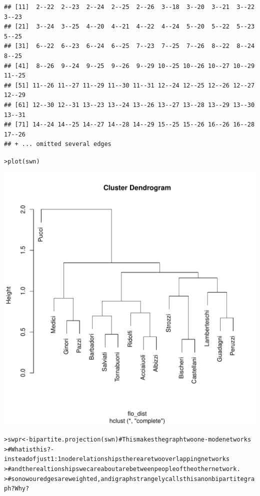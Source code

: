 \documentclass[12pt]{article}\usepackage[]{graphicx}\usepackage[]{color}
\makeatletter
\newcommand{\hlcom}[1]{\textcolor[rgb]{0.404,0.408,0.42}{#1}}%
\newcommand{\hlstd}[1]{\textcolor[rgb]{0.882,0.878,0.898}{#1}}%
\newcommand{\hlkwb}[1]{\textcolor[rgb]{0.902,0.675,0.196}{#1}}%
\newcommand{\hlkwd}[1]{\textcolor[rgb]{0.733,0.388,0.812}{#1}}%
\newenvironment{kframe}{%
 \def\at@end@of@kframe{}%
 \ifinner\ifhmode%
  \def\at@end@of@kframe{\end{minipage}}%
  \begin{minipage}{\columnwidth}%
 \fi\fi%
 \def\FrameCommand##1{\hskip\@totalleftmargin \hskip-\fboxsep
 \colorbox{shadecolor}{##1}\hskip-\fboxsep
     \hskip-\linewidth \hskip-\@totalleftmargin \hskip\columnwidth}%
 \MakeFramed {\advance\hsize-\width
   \@totalleftmargin\z@ \linewidth\hsize
   \@setminipage}}%
 {\par\unskip\endMakeFramed%
 \at@end@of@kframe}
\newenvironment{knitrout}{}{} %
\makeatother
\begin{document}
\begin{flushleft}
\begin{center}
\begin{knitrout}
\begin{kframe}
\begin{verbatim}
## [11]  2--22  2--23  2--24  2--25  2--26  3--18  3--20  3--21  3--22  3--23
## [21]  3--24  3--25  4--20  4--21  4--22  4--24  5--20  5--22  5--23  5--25
## [31]  6--22  6--23  6--24  6--25  7--23  7--25  7--26  8--22  8--24  8--25
## [41]  8--26  9--24  9--25  9--26  9--29 10--25 10--26 10--27 10--29 11--25
## [51] 11--26 11--27 11--29 11--30 11--31 12--24 12--25 12--26 12--27 12--29
## [61] 12--30 12--31 13--23 13--24 13--26 13--27 13--28 13--29 13--30 13--31
## [71] 14--24 14--25 14--27 14--28 14--29 15--25 15--26 16--26 16--28 17--26
## + ... omitted several edges
\end{verbatim}
\begin{alltt}
\hlstd{> }\hlkwd{plot}\hlstd{(swn)}
\end{alltt}
\end{kframe}
\includegraphics[width=6in]{figure/Network_Properties-1} 
\begin{kframe}\begin{alltt}
\hlstd{> }\hlstd{swpr} \hlkwb{<-} \hlkwd{bipartite.projection}\hlstd{(swn)} \hlcom{# This makes the graph two one-mode networks}
\hlstd{> }\hlcom{# What is this? - instead of just 1:1 node relationships there are two overlapping networks}
\hlstd{> }\hlcom{#  and the realtionships we care about are between people of the other network.}
\hlstd{> }\hlcom{#   so now our edges are weighted, and igraph strangely calls this a nonbipartite graph? Why?}

\end{alltt}
\end{kframe}
\end{knitrout}
\end{center}
\end{flushleft}
\end{document}
